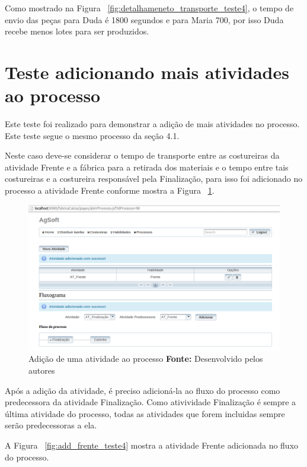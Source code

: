\par Como mostrado na Figura ~\ref{fig:detalhameneto_transporte_teste4}, o tempo
de envio das peças para Duda é 1800 segundos e para Maria 700, por isso
Duda recebe menos lotes para ser produzidos.


\section{Teste adicionando mais atividades ao processo}

\par Este teste foi realizado para demonstrar a adição de mais atividades no
processo. Este teste segue o mesmo processo da seção 4.1.

\par Neste caso deve-se considerar o tempo de transporte entre as costureiras da atividade Frente e a fábrica 
para a retirada dos materiais e o tempo entre tais costureiras e a costureira
responsável pela Finalização, para isso foi adicionado no processo a atividade
Frente conforme mostra a Figura ~\ref{fig:add_frente_teste5}.

\begin{figure}[h!]
	\centerline{\includegraphics[scale=0.3]{./imagens/adiconar_atividade_frente_teste5.png}}
	\caption[Adição de uma atividade ao processo]
	{Adição de uma atividade ao processo \textbf{Fonte:} Desenvolvido pelos autores}
	\label{fig:add_frente_teste5}
\end{figure}

\par Após a adição da atividade, é preciso adicioná-la ao fluxo do processo como
predecessora da atividade Finalização. Como ativividade Finalização é sempre a
última atividade do processo, todas as atividades que forem incluidas sempre
serão predecessoras a ela.
\par A Figura ~\ref{fig:add_frente_teste4} mostra a atividade Frente adicionada
no fluxo do processo.

